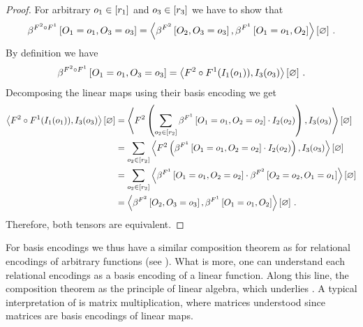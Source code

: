 \begin{proof}
    For arbitrary $o_{1}\in[r_{1}]$ and $o_{3}\in[r_{3}]$ we have to show that
    \begin{align*}
        \beta^{F^{2}\circ F^{1}}\left[O_{1}=o_{1},O_{3}=o_{3}\right]
        = \left\langle 
            \beta^{F^{2}}\left[O_{2},O_{3}=o_{3}\right],\beta^{F^{1}}\left[O_{1}=o_{1},O_{2}\right]
        \right\rangle \left[ \varnothing \right] \, .
    \end{align*}
    By definition we have
    \begin{align*}
        \beta^{F^{2}\circ F^{1}}\left[O_{1}=o_{1},O_{3}=o_{3}\right]
        = \left\langle F^{2}\circ F^{1}(I_{1}(o_{1})),I_{3}(o_{3})\right\rangle \left[ \varnothing \right] \, .
    \end{align*}
    Decomposing the linear maps using their basis encoding we get
    \begin{align*}
        \left\langle F^{2}\circ F^{1}(I_{1}(o_{1})),I_{3}(o_{3})\right\rangle \left[ \varnothing \right]
        &= \left\langle F^{2}\left(\sum_{o_{2}\in[r_{2}]} \beta^{F^{1}}\left[O_{1}=o_{1},O_{2}=o_{2}\right] \cdot I_{2}(o_{2})\right),I_{3}(o_{3})\right\rangle \left[ \varnothing \right] \\
        &= \sum_{o_{2}\in[r_{2}]} \left\langle F^{2}\left(\beta^{F^{1}}\left[O_{1}=o_{1},O_{2}=o_{2}\right] \cdot I_{2}(o_{2})\right),I_{3}(o_{3})\right\rangle \left[ \varnothing \right] \\
        &= \sum_{o_{2}\in[r_{2}]} \left\langle \beta^{F^{1}}\left[O_{1}=o_{1},O_{2}=o_{2}\right] \cdot \beta^{F^{2}}\left[O_{2}=o_{2},O_{1}=o_{1}\right]\right\rangle \left[ \varnothing \right] \\
        &= \left\langle 
            \beta^{F^{2}}\left[O_{2},O_{3}=o_{3}\right],\beta^{F^{1}}\left[O_{1}=o_{1},O_{2}\right]
        \right\rangle \left[ \varnothing \right] \, .
    \end{align*}
    Therefore, both tensors are equivalent.
\end{proof}

For basis encodings we thus have a similar composition theorem as for relational encodings of arbitrary functions (see ).
What is more, one can understand each relational encodings as a basis encoding of a linear function.
Along this line, the composition theorem  as the principle of linear algebra, which underlies .
A typical interpretation of  is matrix multiplication, where matrices understood since matrices are basis encodings of linear maps.

